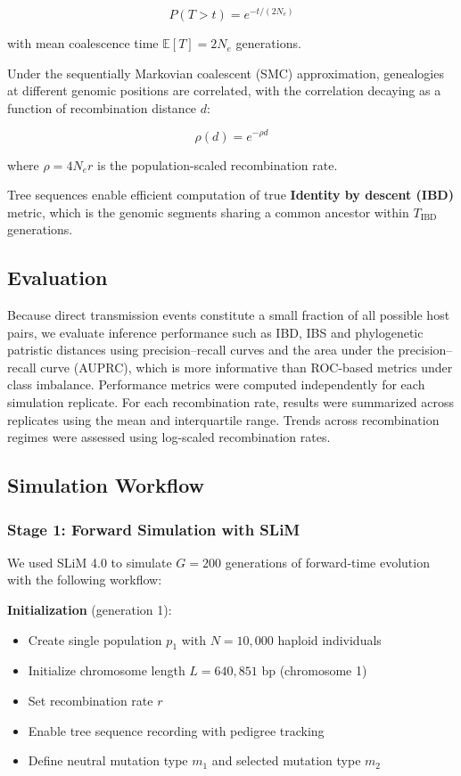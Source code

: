 \documentclass[
  11pt,
]{article}
\providecommand{\tightlist}{%
  \setlength{\itemsep}{0pt}\setlength{\parskip}{0pt}}
\begin{document}
\[P(T > t) = e^{-t/(2N_e)}\]

with mean coalescence time \(\mathbb{E}[T] = 2N_e\) generations.

Under the sequentially Markovian coalescent (SMC) approximation,
genealogies at different genomic positions are correlated, with the
correlation decaying as a function of recombination distance \(d\):

\[\rho(d) = e^{-\rho d}\]

where \(\rho = 4N_e r\) is the population-scaled recombination rate.

Tree sequences enable efficient computation of true \textbf{Identity by
descent (IBD)} metric, which is the genomic segments sharing a common
ancestor within \(T_{\text{IBD}}\) generations.

\subsection{Evaluation}\label{evaluation}

Because direct transmission events constitute a small fraction of all
possible host pairs, we evaluate inference performance such as IBD, IBS
and phylogenetic patristic distances using precision--recall curves and
the area under the precision--recall curve (AUPRC), which is more
informative than ROC-based metrics under class imbalance. Performance
metrics were computed independently for each simulation replicate. For
each recombination rate, results were summarized across replicates using
the mean and interquartile range. Trends across recombination regimes
were assessed using log-scaled recombination rates.

\subsection{Simulation Workflow}\label{simulation-workflow}

\subsubsection{Stage 1: Forward Simulation with
SLiM}\label{stage-1-forward-simulation-with-slim}

We used SLiM 4.0 to simulate \(G = 200\) generations of forward-time
evolution with the following workflow:

\textbf{Initialization} (generation 1):

\begin{itemize}
\tightlist
\item
  Create single population \(p_1\) with \(N = 10,000\) haploid
  individuals
\item
  Initialize chromosome length \(L = 640,851\) bp (chromosome 1)
\item
  Set recombination rate \(r\)
\item
  Enable tree sequence recording with pedigree tracking
\item
  Define neutral mutation type \(m_1\) and selected mutation type
  \(m_2\)
\end{itemize}
\end{document}
